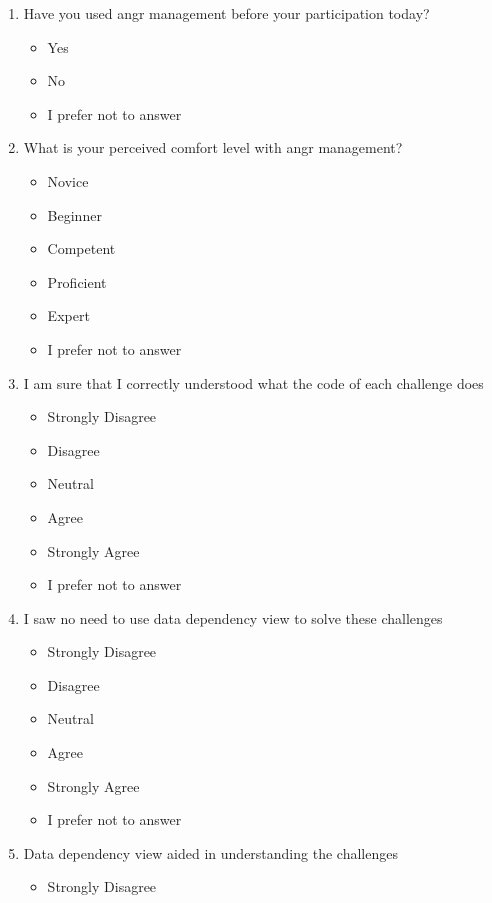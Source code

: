 \begin{enumerate}
\begin{itemize}
    \end{itemize}
    \item Have you used angr management before your participation today?
    \begin{itemize}
        \item Yes
        \item No
        \item I prefer not to answer
    \end{itemize}
    \item What is your perceived comfort level with angr management?
    \begin{itemize}
        \item Novice
        \item Beginner
        \item Competent
        \item Proficient
        \item Expert
        \item I prefer not to answer
    \end{itemize}
    \item I am sure that I correctly understood what the code of each challenge does
    \begin{itemize}
        \item Strongly Disagree
        \item Disagree
        \item Neutral
        \item Agree
        \item Strongly Agree
        \item I prefer not to answer
    \end{itemize}
    \item I saw no need to use data dependency view to solve these challenges
    \begin{itemize}
        \item Strongly Disagree
        \item Disagree
        \item Neutral
        \item Agree
        \item Strongly Agree
        \item I prefer not to answer
    \end{itemize}
    \item Data dependency view aided in understanding the challenges
    \begin{itemize}
        \item Strongly Disagree

\end{itemize}
\end{enumerate}
